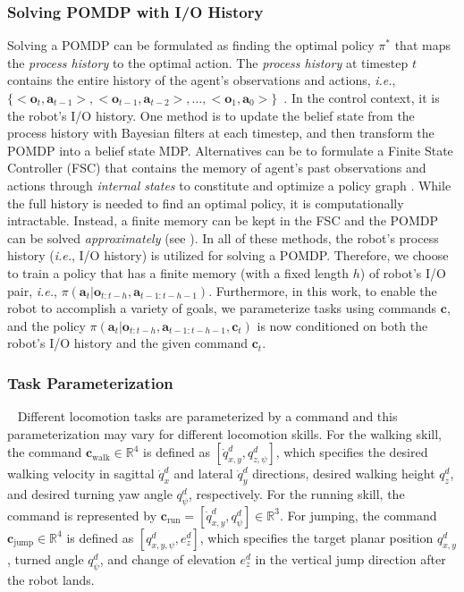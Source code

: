 \subsubsection{Solving POMDP with I/O History}
Solving a POMDP can be formulated as finding the optimal policy $\pi^*$ that maps the \emph{process history} to the optimal action. 
The \emph{process history} at timestep $t$ contains the entire history of the agent's observations and actions, \textit{i.e.}, $\{<\mathbf{o}_t,\mathbf{a}_{t-1}>, <\mathbf{o}_{t-1},\mathbf{a}_{t-2}>, \dots, <\mathbf{o}_1,\mathbf{a}_{0}>\}$~\citep{spaan2012partially}. 
In the control context, it is the robot's I/O history. 
One method is to update the belief state from the process history with Bayesian filters at each timestep, and then transform the POMDP into a belief state MDP. 
Alternatives can be to formulate a Finite State Controller (FSC) that contains the memory of agent's past observations and actions through \emph{internal states} to constitute and optimize a policy graph \cite[Ch. 4]{spaan2012partially}.
While the full history is needed to find an optimal policy, it is computationally intractable. 
Instead, a finite memory can be kept in the FSC and the POMDP can be solved \emph{approximately} (see \cite{meuleau2013learning}).
In all of these methods, the robot's process history (\textit{i.e.}, I/O history) is utilized for solving a POMDP. 
Therefore, we choose to train a policy that has a finite memory (with a fixed length $h$) of robot's I/O pair, \textit{i.e.},  $\pi(\mathbf{a}_t | \mathbf{o}_{t:t-h},\mathbf{a}_{t-1:t-h-1})$. 
Furthermore, in this work, to enable the robot to accomplish a variety of goals, we parameterize tasks using commands $\mathbf{c}$, and the policy $\pi(\mathbf{a}_t | \mathbf{o}_{t:t-h},\mathbf{a}_{t-1:t-h-1}, \mathbf{c}_t)$ is now conditioned on both the robot's I/O history and the given command $\mathbf{c}_t$. 




\subsubsection{Task Parameterization}~\label{subsec:command}
Different locomotion tasks are parameterized by a command and this parameterization may vary for different locomotion skills. 
For the walking skill, the command $\mathbf{c}_{\text{walk}} \in \mathbb{R}^4$ is defined as $[\dot{q}^d_{x,y}, q^d_{z,\psi}]$, which specifies the desired walking velocity in sagittal $\dot{q}^d_x$ and lateral $\dot{q}^d_y$ directions, desired walking height $q^d_z$, and desired turning yaw angle $q^d_{\psi}$, respectively. 
For the running skill, the command is represented by $\mathbf{c}_{\text{run}}=[\dot{q}^d_{x,y}, q^d_{\psi}] \in \mathbb{R}^3$. 
For jumping, the command $\mathbf{c}_{\text{jump}} \in \mathbb{R}^4$ is defined as $[q^d_{x,y,\psi}, e^d_z]$, which specifies the target planar position $q^d_{x,y}$, turned angle $q^d_{\psi}$, and change of elevation $e^d_z$ in the vertical jump direction after the robot lands. 